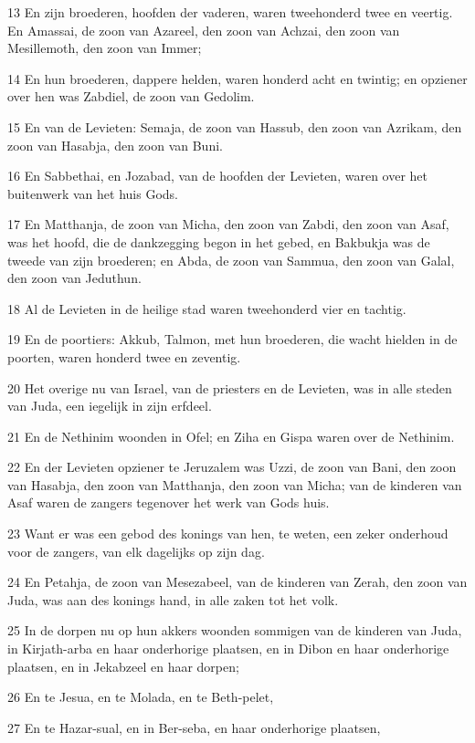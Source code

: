 \par 13 En zijn broederen, hoofden der vaderen, waren tweehonderd twee en veertig. En Amassai, de zoon van Azareel, den zoon van Achzai, den zoon van Mesillemoth, den zoon van Immer;
\par 14 En hun broederen, dappere helden, waren honderd acht en twintig; en opziener over hen was Zabdiel, de zoon van Gedolim.
\par 15 En van de Levieten: Semaja, de zoon van Hassub, den zoon van Azrikam, den zoon van Hasabja, den zoon van Buni.
\par 16 En Sabbethai, en Jozabad, van de hoofden der Levieten, waren over het buitenwerk van het huis Gods.
\par 17 En Matthanja, de zoon van Micha, den zoon van Zabdi, den zoon van Asaf, was het hoofd, die de dankzegging begon in het gebed, en Bakbukja was de tweede van zijn broederen; en Abda, de zoon van Sammua, den zoon van Galal, den zoon van Jeduthun.
\par 18 Al de Levieten in de heilige stad waren tweehonderd vier en tachtig.
\par 19 En de poortiers: Akkub, Talmon, met hun broederen, die wacht hielden in de poorten, waren honderd twee en zeventig.
\par 20 Het overige nu van Israel, van de priesters en de Levieten, was in alle steden van Juda, een iegelijk in zijn erfdeel.
\par 21 En de Nethinim woonden in Ofel; en Ziha en Gispa waren over de Nethinim.
\par 22 En der Levieten opziener te Jeruzalem was Uzzi, de zoon van Bani, den zoon van Hasabja, den zoon van Matthanja, den zoon van Micha; van de kinderen van Asaf waren de zangers tegenover het werk van Gods huis.
\par 23 Want er was een gebod des konings van hen, te weten, een zeker onderhoud voor de zangers, van elk dagelijks op zijn dag.
\par 24 En Petahja, de zoon van Mesezabeel, van de kinderen van Zerah, den zoon van Juda, was aan des konings hand, in alle zaken tot het volk.
\par 25 In de dorpen nu op hun akkers woonden sommigen van de kinderen van Juda, in Kirjath-arba en haar onderhorige plaatsen, en in Dibon en haar onderhorige plaatsen, en in Jekabzeel en haar dorpen;
\par 26 En te Jesua, en te Molada, en te Beth-pelet,
\par 27 En te Hazar-sual, en in Ber-seba, en haar onderhorige plaatsen,
